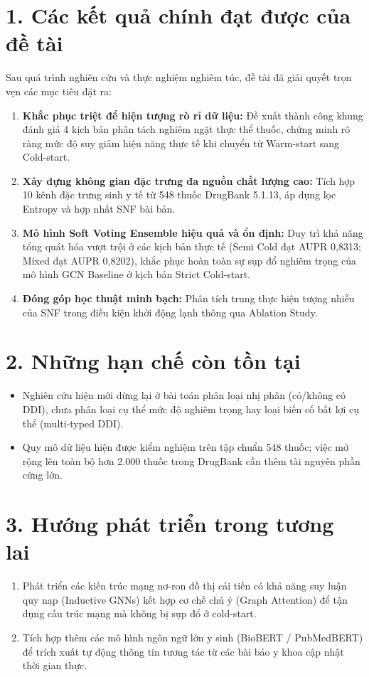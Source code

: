 \documentclass[12pt,a4paper,oneside]{report}
\begin{document}
\section*{1. Các kết quả chính đạt được của đề tài}
Sau quá trình nghiên cứu và thực nghiệm nghiêm túc, đề tài đã giải quyết trọn vẹn các mục tiêu đặt ra:
\begin{enumerate}
  \item \textbf{Khắc phục triệt để hiện tượng rò rỉ dữ liệu:} Đề xuất thành công khung đánh giá 4 kịch bản phân tách nghiêm ngặt thực thể thuốc, chứng minh rõ ràng mức độ suy giảm hiệu năng thực tế khi chuyển từ Warm-start sang Cold-start.
  \item \textbf{Xây dựng không gian đặc trưng đa nguồn chất lượng cao:} Tích hợp 10 kênh đặc trưng sinh y tế từ 548 thuốc DrugBank 5.1.13, áp dụng lọc Entropy và hợp nhất SNF bài bản.
  \item \textbf{Mô hình Soft Voting Ensemble hiệu quả và ổn định:} Duy trì khả năng tổng quát hóa vượt trội ở các kịch bản thực tế (Semi Cold đạt AUPR 0,8313; Mixed đạt AUPR 0,8202), khắc phục hoàn toàn sự sụp đổ nghiêm trọng của mô hình GCN Baseline ở kịch bản Strict Cold-start.
  \item \textbf{Đóng góp học thuật minh bạch:} Phân tích trung thực hiện tượng nhiễu của SNF trong điều kiện khởi động lạnh thông qua Ablation Study.
\end{enumerate}

\section*{2. Những hạn chế còn tồn tại}
\begin{itemize}
  \item Nghiên cứu hiện mới dừng lại ở bài toán phân loại nhị phân (có/không có DDI), chưa phân loại cụ thể mức độ nghiêm trọng hay loại biến cố bất lợi cụ thể (multi-typed DDI).
  \item Quy mô dữ liệu hiện được kiểm nghiệm trên tập chuẩn 548 thuốc; việc mở rộng lên toàn bộ hơn 2.000 thuốc trong DrugBank cần thêm tài nguyên phần cứng lớn.
\end{itemize}

\section*{3. Hướng phát triển trong tương lai}
\begin{enumerate}
  \item Phát triển các kiến trúc mạng nơ-ron đồ thị cải tiến có khả năng suy luận quy nạp (Inductive GNNs) kết hợp cơ chế chú ý (Graph Attention) để tận dụng cấu trúc mạng mà không bị sụp đổ ở cold-start.
  \item Tích hợp thêm các mô hình ngôn ngữ lớn y sinh (BioBERT / PubMedBERT) để trích xuất tự động thông tin tương tác từ các bài báo y khoa cập nhật thời gian thực.
\end{enumerate}
\end{document}
